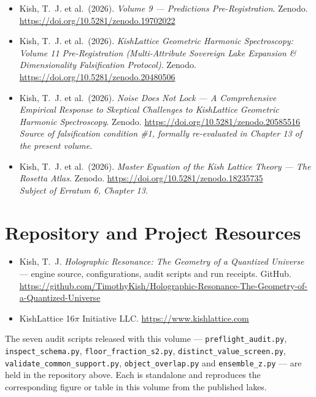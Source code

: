 \documentclass[11pt, letterpaper, openany]{book}
\begin{document}
\begin{itemize}
    \item Kish, T.~J. et al.\ (2026). \textit{Volume 9 --- Predictions Pre-Registration}.
          Zenodo. \url{https://doi.org/10.5281/zenodo.19702022}
    \item Kish, T.~J. et al.\ (2026). \textit{KishLattice Geometric Harmonic Spectroscopy:
          Volume 11 Pre-Registration (Multi-Attribute Sovereign Lake Expansion \&
          Dimensionality Falsification Protocol)}.
          Zenodo. \url{https://doi.org/10.5281/zenodo.20480506}
    \item Kish, T.~J. et al.\ (2026). \textit{Noise Does Not Lock --- A Comprehensive
          Empirical Response to Skeptical Challenges to KishLattice Geometric Harmonic
          Spectroscopy}. Zenodo. \url{https://doi.org/10.5281/zenodo.20585516}
          \\ \textit{Source of falsification condition \#1, formally re-evaluated in
          Chapter 13 of the present volume.}
    \item Kish, T.~J. et al.\ (2026). \textit{Master Equation of the Kish Lattice Theory ---
          The Rosetta Atlas}. Zenodo. \url{https://doi.org/10.5281/zenodo.18235735}
          \\ \textit{Subject of Erratum 6, Chapter 13.}
\end{itemize}

\section*{Repository and Project Resources}

\begin{itemize}
    \item Kish, T.~J. \textit{Holographic Resonance: The Geometry of a Quantized Universe} ---
          engine source, configurations, audit scripts and run receipts. GitHub.
          \url{https://github.com/TimothyKish/Holographic-Resonance-The-Geometry-of-a-Quantized-Universe}
    \item KishLattice 16$\pi$ Initiative LLC. \url{https://www.kishlattice.com}
\end{itemize}

\noindent The seven audit scripts released with this volume ---
\texttt{preflight\_audit.py}, \texttt{inspect\_schema.py}, \texttt{floor\_fraction\_s2.py},
\texttt{distinct\_value\_screen.py}, \texttt{validate\_common\_support.py},
\texttt{object\_overlap.py} and \texttt{ensemble\_z.py} --- are held in the repository above.
Each is standalone and reproduces the corresponding figure or table in this volume from the
published lakes.
\end{document}
